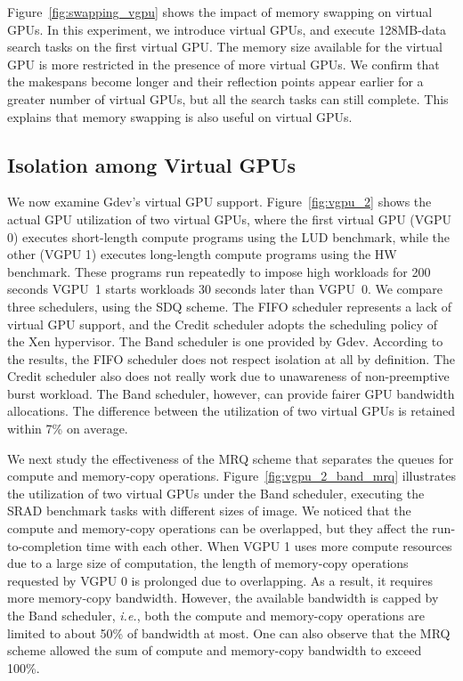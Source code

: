 Figure~\ref{fig:swapping_vgpu} shows the impact of memory swapping on
virtual GPUs.
In this experiment, we introduce virtual GPUs, and execute 128MB-data
search tasks on the first virtual GPU.
The memory size available for the virtual GPU is more restricted in
the presence of more virtual GPUs.
We confirm that the makespans become longer and their reflection points
appear earlier for a greater number of virtual GPUs, but all the search
tasks can still complete.
This explains that memory swapping is also useful on virtual GPUs.

\vspace{-0.25em}
\subsection{Isolation among Virtual GPUs}
\vspace{-0.25em}

We now examine Gdev's virtual GPU support.
Figure~\ref{fig:vgpu_2} shows the actual GPU utilization of two virtual
GPUs, where the first virtual GPU (VGPU 0) executes short-length compute
programs using the LUD benchmark, while the other (VGPU 1) executes
long-length compute programs using the HW benchmark.
These programs run repeatedly to impose high workloads for 200 seconds
VGPU~1 starts workloads 30 seconds later than VGPU~0.
We compare three schedulers, using the SDQ scheme.
The FIFO scheduler represents a lack of virtual GPU support, and
the Credit scheduler adopts the scheduling policy of the Xen
hypervisor.
The Band scheduler is one provided by Gdev.
According to the results, the FIFO scheduler does not respect isolation
at all by definition.
The Credit scheduler also does not really work due to unawareness of
non-preemptive burst workload.
The Band scheduler, however, can provide fairer GPU bandwidth allocations.
The difference between the utilization of two virtual GPUs is retained
within 7\% on average.

We next study the effectiveness of the MRQ scheme that separates the
queues for compute and memory-copy operations.
Figure~\ref{fig:vgpu_2_band_mrq} illustrates the utilization of two
virtual GPUs under the Band scheduler, executing the SRAD benchmark
tasks with different sizes of image.
We noticed that the compute and memory-copy operations can be
overlapped, but they affect the run-to-completion time with each other.
When VGPU 1 uses more compute resources due to a large size of
computation, the length of memory-copy operations requested by VGPU 0 is
prolonged due to overlapping.
As a result, it requires more memory-copy bandwidth.
However, the available bandwidth is capped by the Band scheduler,
\textit{i.e.}, both the compute and memory-copy operations are limited 
to about 50\% of bandwidth at most.
One can also observe that the MRQ scheme allowed the sum of compute and
memory-copy bandwidth to exceed 100\%.

